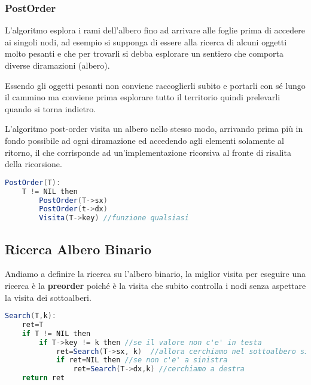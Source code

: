 \subsubsection{PostOrder}
L'algoritmo esplora i rami dell'albero fino ad arrivare alle foglie prima di accedere ai singoli nodi, ad esempio si supponga di essere alla ricerca di alcuni oggetti molto pesanti e che per trovarli si debba esplorare un sentiero che comporta diverse diramazioni (albero).

Essendo gli oggetti pesanti non conviene raccoglierli subito e portarli con sé lungo il cammino ma conviene prima esplorare tutto il territorio quindi prelevarli quando si torna indietro.

L'algoritmo post-order visita un albero nello stesso modo, arrivando prima più in fondo possibile ad ogni diramazione ed accedendo agli elementi solamente al ritorno, il che corrisponde ad un'implementazione ricorsiva al fronte di risalita della ricorsione. 
\begin{lstlisting}[language=Java]
PostOrder(T):
	T != NIL then
		PostOrder(T->sx)
		PostOrder(t->dx)	
		Visita(T->key) //funzione qualsiasi
\end{lstlisting}

\subsection{Ricerca Albero Binario}
Andiamo a definire la ricerca su l'albero binario, la miglior visita per eseguire una ricerca è la \textbf{preorder} poiché è la visita che subito controlla i nodi senza aspettare la visita dei sottoalberi.
\begin{lstlisting}[language=Java]
Search(T,k):
	ret=T
	if T != NIL then
		if T->key != k then //se il valore non c'e' in testa
			ret=Search(T->sx, k)  //allora cerchiamo nel sottoalbero sinistro
			if ret=NIL then //se non c'e' a sinistra
				ret=Search(T->dx,k) //cerchiamo a destra
	return ret
\end{lstlisting}
